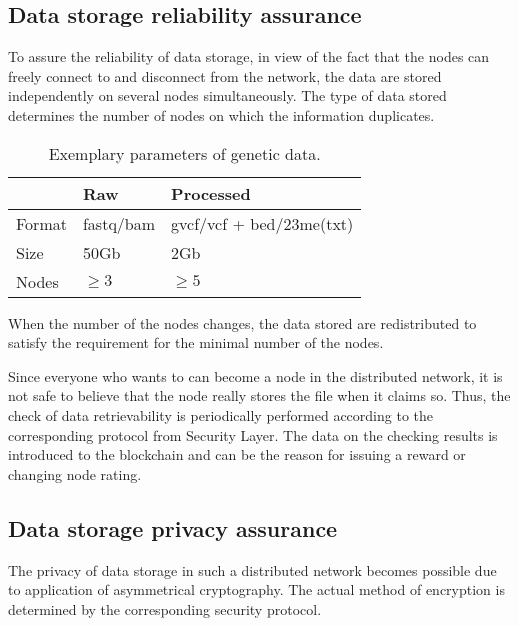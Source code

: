 %
%
%
%
%
%


\subsection{Data storage reliability assurance}
To assure the reliability of data storage, in view of the fact that the nodes can freely connect to and disconnect from the network, the data are stored independently on several nodes simultaneously. The type of data stored determines the number of nodes on which the information duplicates.


\begin{table}[H] \centering
  \caption{Exemplary parameters of genetic data.}
  \begin{tabular}{l|p{5cm}|p{5cm}}
              &  Raw       &  Processed  \\ \hline
     Format   & fastq/bam  & gvcf/vcf + bed/23me(txt) \\
     Size     & 50Gb       & 2Gb \\
     Nodes    & $\ge 3$    & $\ge 5$ \\ \hline
  \end{tabular}
\end{table}


When the number of the nodes changes, the data stored are redistributed to satisfy the requirement for the minimal number of the nodes.

Since everyone who wants to can become a node in the distributed network, it is not safe to believe that the node really stores the file when it claims so. Thus, the check of data retrievability is periodically performed according to the corresponding protocol from Security Layer.
The data on the checking results is introduced to the blockchain and can be the reason for issuing a reward or changing node rating.

\subsection{Data storage privacy assurance}
The privacy of data storage in such a distributed network becomes possible due to application of asymmetrical cryptography. The actual method of encryption is determined by the corresponding security protocol.

